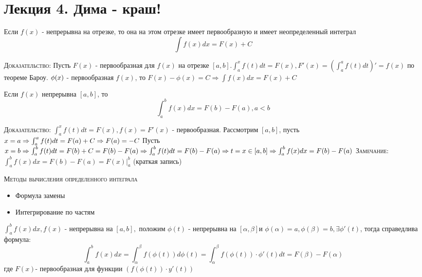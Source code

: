 \chapter{Лекция 4. Дима - краш!}
    \begin{theorem}
        Если $f(x)$ - непрерывна на отрезке, то она на этом отрезке имеет первообразную и имеет неопределенный интеграл $$\int f(x) dx = F(x) + C$$

        \textsc{Доказательство:} Пусть $F(x)$ - первообразная для $f(x)$ на отрезке $[a,b]. \int_a^x f(t) dt = F(x), F'(x) = (\int^a_a f(t) dt)' = f(x) $ по теореме Бароу. 
        $ \\ \phi(x) $ - первообразная $f(x)$, то $F(x) - \phi(x) = C \Rightarrow \int f(x)dx = F(x) + C$

    \end{theorem}

    \begin{theorem}
        Если $f(x)$ непрерывна $[a,b]$, то $$\int^b_a f(x)dx = F(b) - F(a), a<b$$

        \textsc{Доказательство:}
            $\int^x_a f(t)dt = F(x), f(x) = F'(x)$ - первообразная. Рассмотрим $[a,b]$, пусть $x=a \Rightarrow \int^a_a f(t)dt = F(a) + C \Rightarrow F(a) = -C \\$
            Пусть $x = b \Rightarrow \int^b_a f(t) dt = F(b) + C = F(b)-F(a) \Rightarrow \int^b_a f(t)dt = F(b) - F(a) \Rightarrow t = x \in [a,b] \Rightarrow \int^b_a f(x)dx = F(b) - F(a) \\ $
        \textsc{Замечание:} $\int^b_a f(x)dx = F(b) - F(a) = F(x)|^b_a$ (краткая запись)

    \end{theorem}

    \textsc{Методы вычисления определенного интеграла}
    \begin{itemize}
        \item Формула замены
        \item Интегрирование по частям
    \end{itemize}

    \begin{theorem}
        $\int^b_a f(x)dx , f(x)$ - непрерывна на $[a,b], $ положим $\phi(t)$ - непрерывна на $[\alpha, \beta]$и $\phi(\alpha) = a, \phi(\beta) = b, \exists \phi'(t)$, тогда справедлива формула:
        $$
            \int^b_a f(x)dx = \int^{\beta}_{\alpha} f(\phi(t)) d\phi(t) = \int^{\beta}_{\alpha} f(\phi(t))\cdot \phi'(t) dt = F(\beta) - F(\alpha)$$ где $F(x)$- первообразная для функции $(f(\phi(t))\cdot y'(t))$
    \end{theorem}

